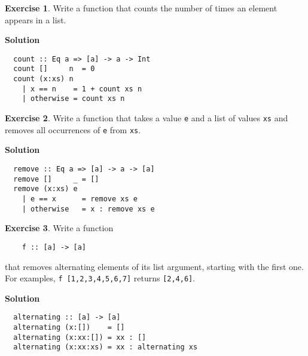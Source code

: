 \documentclass[11pt,a4paper]{article}
\theoremstyle{definition}
\newtheorem{exr}{Exercise}
\begin{document}
\newpage

\begin{exr}
  Write a function that counts the number of times an element appears in a list.
\end{exr}

\textbf{Solution}
\begin{lstlisting}
  count :: Eq a => [a] -> a -> Int
  count []     n  = 0
  count (x:xs) n
    | x == n    = 1 + count xs n
    | otherwise = count xs n
\end{lstlisting}


\vspace{5mm}

\begin{exr}
  Write a function that takes a value \texttt{e} and a list of values \texttt{xs}
  and removes all occurrences of \texttt{e} from \texttt{xs}.
\end{exr}

\textbf{Solution}
\begin{lstlisting}
  remove :: Eq a => [a] -> a -> [a]
  remove []     _ = []
  remove (x:xs) e
    | e == x      = remove xs e
    | otherwise   = x : remove xs e
\end{lstlisting}


\vspace{5mm}

\begin{exr}
  Write a function 
  
  \begin{lstlisting}
    f :: [a] -> [a]
  \end{lstlisting}

  that removes alternating elements of its list argument, starting with 
  the first one. For examples, \texttt{f [1,2,3,4,5,6,7]} returns 
  \texttt{[2,4,6]}.
\end{exr}

\textbf{Solution}
\begin{lstlisting}
  alternating :: [a] -> [a]
  alternating (x:[])    = []
  alternating (x:xx:[]) = xx : []
  alternating (x:xx:xs) = xx : alternating xs
\end{lstlisting}


\vspace{5mm}
\end{document}
